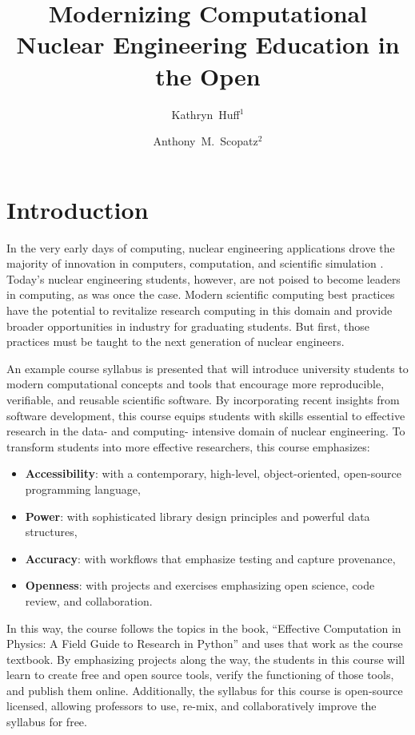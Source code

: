 \documentclass{anstrans}
\title{Modernizing Computational Nuclear Engineering Education in the Open}
\author{Kathryn~Huff$^{1}$ \and Anthony~M.~Scopatz$^{2}$}
\institute{
$^{1}$ The University of California -- Berkeley, Berkeley, CA 94709 \\
\and $^{2}$ The University of South Carolina, Columbia, SC 29208 \\
}
\begin{document}
\section{Introduction}

In the very early days of computing, nuclear engineering applications drove the
majority of innovation in computers, computation, and scientific simulation
\cite{rhodes_making_2012}. Today's nuclear engineering students, however, are
not poised to become leaders in computing, as was once the case. Modern
scientific computing best practices have the potential to revitalize research
computing in this domain and provide broader opportunities in industry for
graduating students. But first, those practices must be taught to the next 
generation of nuclear engineers.

An example course syllabus is presented that will introduce university students
to modern computational concepts and tools that encourage more reproducible, 
verifiable, and reusable scientific software. By incorporating recent insights
from software development, this course equips students with skills essential
to effective research in the data- and computing- intensive domain of nuclear
engineering.  To transform students into more effective researchers, this
course emphasizes:

\begin{itemize}
\item \textbf{Accessibility}: with a contemporary, high-level, object-oriented, open-source programming language,
\item \textbf{Power}: with sophisticated library design principles and powerful data structures,
\item \textbf{Accuracy}: with workflows that emphasize testing and capture provenance,
\item \textbf{Openness}: with projects and exercises emphasizing open science, code review, and collaboration.
\end{itemize}

In this way, the course follows the topics in the book, ``Effective Computation
in Physics: A Field Guide to Research in Python'' \cite{scopatz_effective_2015}
and uses that work as the course textbook.  By emphasizing projects along the
way, the students in this course will learn to create free and open source
tools, verify the functioning of those tools, and publish them online.
Additionally, the syllabus for this course is open-source licensed, allowing
professors to use, re-mix, and collaboratively improve the syllabus for free.
\end{document}
